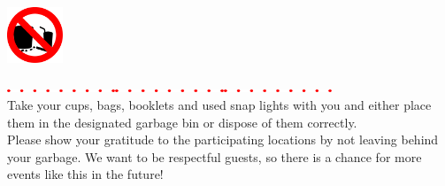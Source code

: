 \begin{changemargin}{1cm}{1cm}
\includegraphics[width=1.66cm,keepaspectratio]{images/no_littering.pdf}%
\vspace{-2.5em}
\begin{changemargin}{2cm}{0cm}
\hspace{0.5mm}\includegraphics[height=1mm,keepaspectratio]{images/dots_red.pdf}\hspace{3mm}\includegraphics[height=1mm,keepaspectratio]{images/dots_red.pdf}\hspace{3mm}\includegraphics[trim={0 0 9mm 0},clip,height=1mm,keepaspectratio]{images/dots_red.pdf}\\
\small Take your cups, bags, booklets and used snap lights with you and either place them in the designated garbage bin or dispose of them correctly.\\
{\footnotesize Please show your gratitude to the participating locations by not leaving behind your garbage. We want to be respectful guests, so there is a chance for more events like this in the future!}
\end{changemargin}

\vspace*{\fill}


\end{changemargin}
